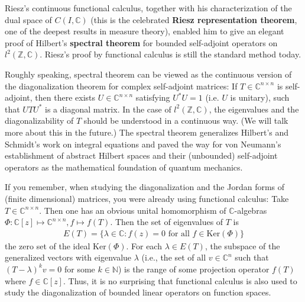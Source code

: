 \documentclass[12pt,b5paper,notitlepage]{article}
\theoremstyle{definition}
\theoremstyle{plain}
\newcommand{\Cbb}{\mathbb C}
\newcommand{\Nbb}{\mathbb N}
\newcommand{\Zbb}{\mathbb Z}
\newcommand{\Ker}{\mathrm{Ker}}
\numberwithin{equation}{section}
\begin{document}
Riesz's continuous functional calculus, together with his characterization of the dual space of $C(I,\Cbb)$ (this is the celebrated \textbf{Riesz representation theorem}, one of the deepest results in measure theory), enabled him to give an elegant proof of Hilbert's \textbf{spectral theorem} for bounded self-adjoint operators on $l^2(\Zbb,\Cbb)$. Riesz's proof by functional calculus is still the standard method today. 

Roughly speaking, spectral theorem can be viewed as the continuous version of the diagonalization theorem for complex self-adjoint matrices: If $T\in \Cbb^{n\times n}$ is self-adjoint, then there exists $U\in\Cbb^{n\times n}$ satisfying $U^*U=1$ (i.e. $U$ is unitary), such that $UTU^*$ is a diagonal matrix. In the case of $l^2(\Zbb,\Cbb)$, the eigenvalues and the diagonalizability of $T$ should be understood in a continuous way. (We will talk more about this in the future.) The spectral theorem generalizes Hilbert's and Schmidt's work on integral equations and paved the way for von Neumann's establishment of abstract Hilbert spaces and their (unbounded) self-adjoint operators as the mathematical foundation of quantum mechanics.




If you remember, when studying the diagonalization and the Jordan forms of (finite dimensional) matrices, you were already using functional calculus: Take $T\in\Cbb^{n\times n}$. Then one has an obvious unital homomorphism of $\Cbb$-algebras $\Phi:\Cbb[z]\mapsto\Cbb^{n\times n},f\mapsto f(T)$. Then the set of eigenvalues of $T$ is 
\begin{align*}
E(T)=\{\lambda\in\Cbb:f(z)=0\text{ for all }f\in\Ker(\Phi)\}
\end{align*}
the zero set of the ideal $\Ker(\Phi)$. For each $\lambda\in E(T)$,  the subspace of the generalized vectors with eigenvalue $\lambda$ (i.e., the set of all $v\in \Cbb^n$ such that $(T-\lambda)^kv=0$ for some $k\in\Nbb$) is the range of some projection operator $f(T)$ where $f\in\Cbb[z]$. Thus, it is no surprising that functional calculus is also used to study the diagonalization of bounded linear operators on function spaces.
\end{document}
